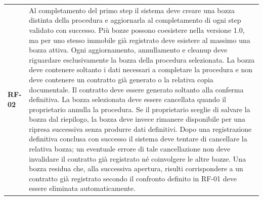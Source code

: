 \documentclass[12pt,a4paper]{article}
\newcommand{\req}[1]{\textbf{#1}}
\begin{document}
\begin{longtable}{>{\raggedright\arraybackslash}p{1.8cm}
                  >{\raggedright\arraybackslash}p{13cm}}
\req{RF-02} &
Al completamento del primo step il sistema deve creare una bozza distinta della procedura e
aggiornarla al completamento di ogni step validato con successo. Più bozze possono coesistere
nella versione 1.0, ma per uno stesso immobile già registrato deve esistere al massimo una
bozza attiva. Ogni aggiornamento, annullamento e cleanup deve riguardare esclusivamente la bozza
della procedura selezionata. La bozza deve contenere soltanto i dati necessari a completare la
procedura e non deve contenere un contratto già generato o la relativa copia documentale. Il
contratto deve essere generato soltanto alla conferma definitiva. La bozza selezionata deve essere
cancellata quando il proprietario annulla la procedura. Se il proprietario sceglie di salvare la
bozza dal riepilogo, la bozza deve invece rimanere disponibile per una ripresa successiva senza
produrre dati definitivi. Dopo una registrazione definitiva conclusa
con successo il sistema deve tentare di cancellare la relativa bozza; un eventuale errore di tale
cancellazione non deve invalidare il contratto già registrato né coinvolgere le altre bozze. Una
bozza residua che, alla successiva apertura, risulti corrispondere a un contratto già registrato
secondo il confronto definito in RF-01 deve essere eliminata automaticamente. \\


\end{longtable}
\end{document}
